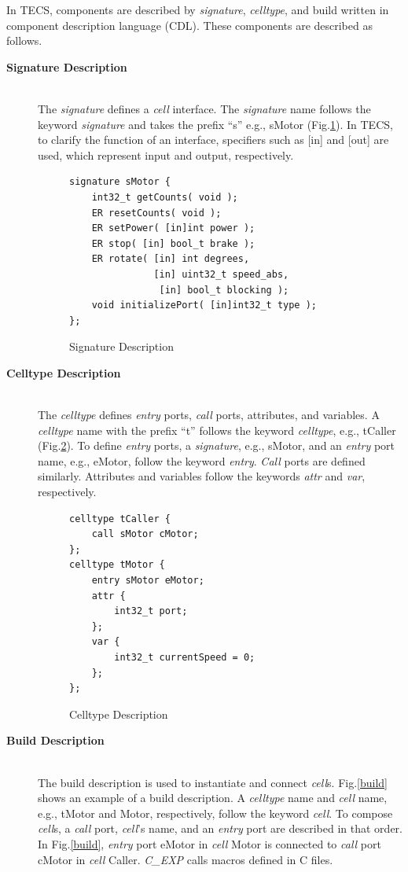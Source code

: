 \documentclass[conference]{IEEEtran/IEEEtran}
\begin{document}
In TECS, components are described by {\it signature}, {\it celltype}, and build written in component description language (CDL).
These components are described as follows.

\begin{description}
    \item[{\bf Signature Description}]\mbox{}\\
        The {\it signature} defines a {\it cell} interface.
        The {\it signature} name follows the keyword {\it signature} and takes the prefix ``s'' e.g., sMotor (Fig.\ref{signature}).
        In TECS, to clarify the function of an interface, specifiers such as [in] and [out] are used, which represent input and output, respectively.
\begin{figure}[t]
\centering
\begin{lstlisting}
signature sMotor {
    int32_t getCounts( void );
    ER resetCounts( void );
    ER setPower( [in]int power );
    ER stop( [in] bool_t brake );
    ER rotate( [in] int degrees,
               [in] uint32_t speed_abs,
                [in] bool_t blocking );
    void initializePort( [in]int32_t type );
};
\end{lstlisting}
\caption{Signature Description}
\label{signature}
\end{figure}
    \item[{\bf Celltype Description}]\mbox{}\\
        The {\it celltype} defines {\it entry} ports, {\it call} ports, attributes, and variables.
        A {\it celltype} name with the prefix ``t'' follows the keyword {\it celltype}, e.g., tCaller (Fig.\ref{celltype}).
        To define {\it entry} ports, a {\it signature}, e.g., sMotor, and an {\it entry} port name, e.g., eMotor, follow the keyword {\it entry}.
        {\it Call} ports are defined similarly.
        Attributes and variables follow the keywords {\it attr} and {\it var}, respectively.
\begin{figure}[t]
\centering
\begin{lstlisting}
celltype tCaller {
    call sMotor cMotor;
};
celltype tMotor {
    entry sMotor eMotor;
    attr {
        int32_t port;
    };
    var {
        int32_t currentSpeed = 0;
    };
};
\end{lstlisting}
\caption{Celltype Description}
\label{celltype}
\end{figure}
    \item[{\bf Build Description}]\mbox{}\\
        The build description is used to instantiate and connect {\it cell}s.
        Fig.\ref{build} shows an example of a build description.
        A {\it celltype} name and {\it cell} name, e.g., tMotor and Motor, respectively, follow the keyword {\it cell}.
        To compose {\it cell}s, a {\it call} port, {\it cell}'s name, and an {\it entry} port are described in that order.
        In Fig.\ref{build}, {\it entry} port eMotor in {\it cell} Motor is connected to {\it call} port cMotor in {\it cell} Caller.
        {\it C\_EXP} calls macros defined in C files.


\end{description}
\end{document}
